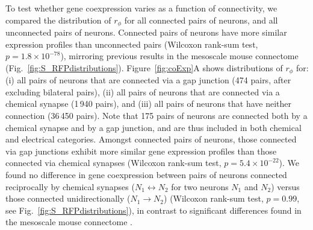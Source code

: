 \documentclass[10pt,letterpaper]{article}
\begin{document}
To test whether gene coexpression varies as a function of connectivity, we compared the distribution of $r_\phi$ for all connected pairs of neurons, and all unconnected pairs of neurons.
Connected pairs of neurons have more similar expression profiles than unconnected pairs (Wilcoxon rank-sum test, $p = 1.8 \times 10^{-78}$), mirroring previous results in the mesoscale mouse connectome \cite{Fulcher:2016ck} (Fig.~\ref{fig:S_RFPdistributions}).
Figure~\ref{fig:coExp}A shows distributions of $r_\phi$ for:
(i) all pairs of neurons that are connected via a gap junction (474 pairs, after excluding bilateral pairs),
(ii) all pairs of neurons that are connected via a chemical synapse (1\,940 pairs), and
(iii) all pairs of neurons that have neither connection (36\,450 pairs).
Note that 175 pairs of neurons are connected both by a chemical synapse and by a gap junction, and are thus included in both chemical and electrical categories.
Amongst connected pairs of neurons, those connected via gap junctions exhibit more similar gene expression profiles than those connected via chemical synapses (Wilcoxon rank-sum test, $p = 5.4 \times 10^{-22}$).
We found no difference in gene coexpression between pairs of neurons connected reciprocally by chemical synapses ($N_1 \leftrightarrow N_2$ for two neurons $N_1$ and $N_2$) versus those connected unidirectionally ($N_1 \rightarrow N_2$) (Wilcoxon rank-sum test, $p = 0.99$, see Fig.~\ref{fig:S_RFPdistributions}), in contrast to significant differences found in the mesoscale mouse connectome \cite{Fulcher:2016ck}.
\end{document}
